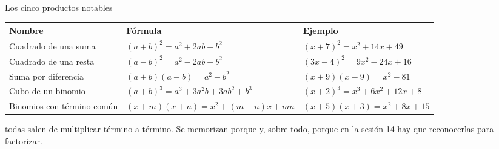 \documentclass[aspectratio=169,10pt]{beamer}
\begin{document}
\begin{frame}{Los cinco productos notables}
  \scriptsize
  \begin{center}
  \begin{tabular}{@{}p{3.6cm}p{4.2cm}p{4.4cm}@{}}
    \toprule
    \textbf{Nombre} & \textbf{Fórmula} & \textbf{Ejemplo} \\
    \midrule
    Cuadrado de una suma &
      $(a+b)^{2} = a^{2}+2ab+b^{2}$ &
      $(x+7)^{2} = x^{2}+14x+49$ \\
    \addlinespace
    Cuadrado de una resta &
      $(a-b)^{2} = a^{2}-2ab+b^{2}$ &
      $(3x-4)^{2} = 9x^{2}-24x+16$ \\
    \addlinespace
    Suma por diferencia &
      $(a+b)(a-b) = a^{2}-b^{2}$ &
      $(x+9)(x-9) = x^{2}-81$ \\
    \addlinespace
    Cubo de un binomio &
      $(a+b)^{3} = a^{3}+3a^{2}b+3ab^{2}+b^{3}$ &
      $(x+2)^{3} = x^{3}+6x^{2}+12x+8$ \\
    \addlinespace
    Binomios con término común &
      $(x+m)(x+n) = x^{2}+(m+n)x+mn$ &
      $(x+5)(x+3) = x^{2}+8x+15$ \\
    \bottomrule
  \end{tabular}
  \end{center}

  \vspace{0.06cm}
  {\tiny\color{uniGris}  todas salen de
  multiplicar término a término. Se memorizan porque  y,
  sobre todo, porque en la sesión 14 hay que reconocerlas 
  para factorizar.}
\end{frame}
\end{document}
